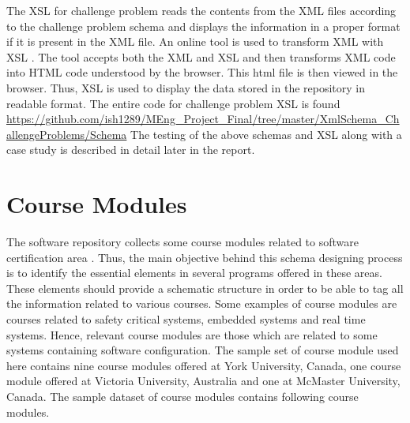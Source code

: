 \documentclass[11pt,letterpaper]{report}
\begin{document}
The XSL for challenge problem reads the contents from the XML files according to the challenge problem schema and displays the information in a proper format if it is present in the XML file. An online tool is used to transform XML with XSL \cite{olXSL}. The tool accepts both the XML and XSL and then transforms XML code into HTML code understood by the browser. This html file is then viewed in the browser. Thus, XSL is used to display the data stored in the repository in readable format. The entire code for challenge problem XSL is found \url{https://github.com/ish1289/MEng_Project_Final/tree/master/XmlSchema_ChallengeProblems/Schema}
\bigskip
The testing of the above schemas and XSL along with a case study is described in detail later in the report. 

\chapter{Course Modules}
The software repository collects some course modules related to software certification area \cite{York,Waterloo, MaC,Victoria}. Thus, the main objective behind this schema designing process is to identify the essential elements in several programs offered in these areas. These elements should provide a schematic structure in order to be able to tag all the information related to various courses. Some examples of course modules are courses related to safety critical systems, embedded systems and real time systems. Hence, relevant course modules are those which are related to some systems containing software configuration. The sample set of course module used here contains nine course modules offered at York University, Canada, one course module offered at Victoria University, Australia and one at McMaster University, Canada. The sample dataset of course modules contains following course modules. 
\end{document}
